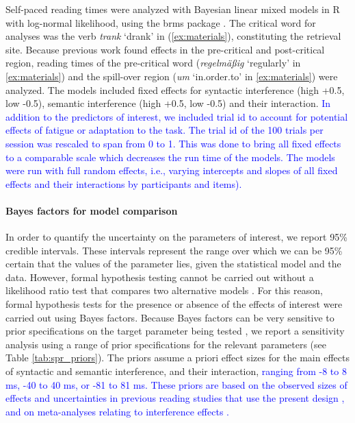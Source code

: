 \documentclass[a4paper, man, floatsintext]{apa7}
\begin{document}
Self-paced reading times were analyzed with Bayesian linear mixed models in R \citep{r} with log-normal likelihood, using the brms package \citep{brms}. The critical word for analyses was the verb \textit{trank} `drank' in (\ref{ex:materials}), constituting the retrieval site. Because previous work found effects in the pre-critical and post-critical region, reading times of the pre-critical word (\textit{regelmäßig} `regularly' in \ref{ex:materials}) and the spill-over region (\textit{um} `in.order.to' in \ref{ex:materials}) were analyzed. 
The models included fixed effects for syntactic interference (high +0.5, low -0.5), semantic interference (high +0.5, low -0.5) and their interaction. \textcolor{blue}{In addition to the predictors of interest, we included trial id to account for potential effects of fatigue or adaptation to the task. The trial id of the 100 trials per session was rescaled to span from 0 to 1. This was done to bring all fixed effects to a comparable scale which decreases the run time of the models. The models were run with full random effects, i.e., varying intercepts and slopes of all fixed effects and their interactions by participants and items).}  

\paragraph{Bayes factors for model comparison}\label{BF_analysis_SPR}

In order to quantify the uncertainty on the parameters of interest, we report 95\% credible intervals. These intervals represent the range over which we can be 95\% certain that the values of the parameter lies, given the statistical model and the data. However, formal hypothesis testing cannot be carried out without a likelihood ratio test that compares two alternative models \parencite{schad_etal_2022_BF,Royall}. For this reason, formal hypothesis tests for the presence or absence of the effects of interest were carried out using Bayes factors. Because Bayes factors can be very sensitive to prior specifications on the target parameter being tested \parencite{schad_etal_2022_BF}, 
we report a sensitivity analysis using a range of prior specifications for the relevant parameters (see Table \ref{tab:spr_priors}). The priors assume a priori effect sizes for the main effects of syntactic and semantic interference, and their interaction, \textcolor{blue}{ranging from -8 to 8 ms, -40 to 40 ms, or -81 to 81 ms. These priors are based on the observed sizes of effects and uncertainties in previous reading studies that use the present design \parencite{vandyke07,mertzen}, and on meta-analyses relating to interference effects \parencite{jaeger_etal_2017}.} 
\end{document}
